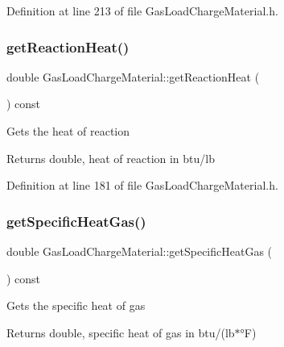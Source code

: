 Definition at line 213 of file Gas\+Load\+Charge\+Material.\+h.

\mbox{\label{class_gas_load_charge_material_a605eaf21d1f25f27b53627aeb903c93d}} 
\subsubsection{\texorpdfstring{get\+Reaction\+Heat()}{getReactionHeat()}}
{\footnotesize\ttfamily double Gas\+Load\+Charge\+Material\+::get\+Reaction\+Heat (\begin{DoxyParamCaption}{ }\end{DoxyParamCaption}) const\hspace{0.3cm}{\ttfamily [inline]}}

Gets the heat of reaction \begin{DoxyReturn}{Returns}
double, heat of reaction in btu/lb 
\end{DoxyReturn}


Definition at line 181 of file Gas\+Load\+Charge\+Material.\+h.

\mbox{\label{class_gas_load_charge_material_a66e956e7a52b1032a3e8a725f26fa580}} 
\subsubsection{\texorpdfstring{get\+Specific\+Heat\+Gas()}{getSpecificHeatGas()}}
{\footnotesize\ttfamily double Gas\+Load\+Charge\+Material\+::get\+Specific\+Heat\+Gas (\begin{DoxyParamCaption}{ }\end{DoxyParamCaption}) const\hspace{0.3cm}{\ttfamily [inline]}}

Gets the specific heat of gas \begin{DoxyReturn}{Returns}
double, specific heat of gas in btu/(lb$\ast$°F) 
\end{DoxyReturn}


